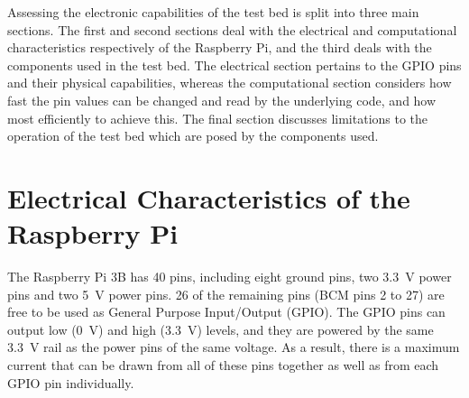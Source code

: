 \documentclass[../main.tex]{subfiles}
\begin{document}
Assessing the electronic capabilities of the test bed is split into three main sections.
The first and second sections deal with the electrical and computational characteristics respectively of the Raspberry Pi, and the third deals with the components used in the test bed.
The electrical section pertains to the GPIO pins and their physical capabilities, whereas the computational section considers how fast the pin values can be changed and read by the underlying code, and how most efficiently to achieve this.
The final section discusses limitations to the operation of the test bed which are posed by the components used.\\


\section{Electrical Characteristics of the Raspberry Pi}

The Raspberry Pi 3B has 40 pins, including eight ground pins, two \SI{3.3}{\volt} power pins and two \SI{5}{\volt} power pins.
26 of the remaining pins (BCM pins 2 to 27) are free to be used as General Purpose Input/Output (GPIO).
The GPIO pins can output low (\SI{0}{\volt}) and high (\SI{3.3}{\volt}) levels, and they are powered by the same \SI{3.3}{\volt} rail as the power pins of the same voltage.
As a result, there is a maximum current that can be drawn from all of these pins together as well as from each GPIO pin individually.\\
\end{document}
